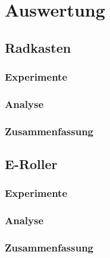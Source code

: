 \section{Auswertung}

\subsection{Radkasten}
\subsubsection{Experimente}
\subsubsection{Analyse}
\subsubsection{Zusammenfassung}


\subsection{E-Roller}
\subsubsection{Experimente}
\subsubsection{Analyse}
\subsubsection{Zusammenfassung}

